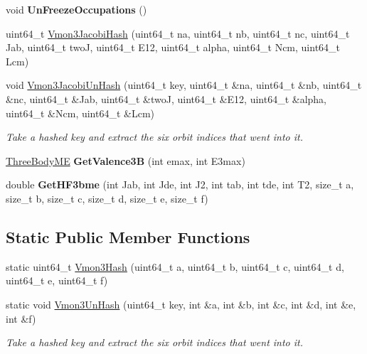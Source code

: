 \begin{DoxyCompactItemize}
\item 
\hypertarget{classHartreeFock_ab7aa734d2b1df54ddba236f279269fcc}{void {\bfseries Un\-Freeze\-Occupations} ()}\label{classHartreeFock_ab7aa734d2b1df54ddba236f279269fcc}

\item 
uint64\-\_\-t \hyperlink{classHartreeFock_ab9b00d4cece0e9424b09bd5faaef8276}{Vmon3\-Jacobi\-Hash} (uint64\-\_\-t na, uint64\-\_\-t nb, uint64\-\_\-t nc, uint64\-\_\-t Jab, uint64\-\_\-t two\-J, uint64\-\_\-t E12, uint64\-\_\-t alpha, uint64\-\_\-t Ncm, uint64\-\_\-t Lcm)
\item 
\hypertarget{classHartreeFock_a62997db6f9334dbe83c191aec4ab127d}{void \hyperlink{classHartreeFock_a62997db6f9334dbe83c191aec4ab127d}{Vmon3\-Jacobi\-Un\-Hash} (uint64\-\_\-t key, uint64\-\_\-t \&na, uint64\-\_\-t \&nb, uint64\-\_\-t \&nc, uint64\-\_\-t \&Jab, uint64\-\_\-t \&two\-J, uint64\-\_\-t \&E12, uint64\-\_\-t \&alpha, uint64\-\_\-t \&Ncm, uint64\-\_\-t \&Lcm)}\label{classHartreeFock_a62997db6f9334dbe83c191aec4ab127d}

\begin{DoxyCompactList}\small\item\em Take a hashed key and extract the six orbit indices that went into it. \end{DoxyCompactList}\item 
\hypertarget{classHartreeFock_a0793c0eb66a02f0cdb1a7b810be29c9b}{\hyperlink{classThreeBodyME}{Three\-Body\-M\-E} {\bfseries Get\-Valence3\-B} (int emax, int E3max)}\label{classHartreeFock_a0793c0eb66a02f0cdb1a7b810be29c9b}

\item 
\hypertarget{classHartreeFock_a4396c3d072ce9c31faf27dcb91fe345e}{double {\bfseries Get\-H\-F3bme} (int Jab, int Jde, int J2, int tab, int tde, int T2, size\-\_\-t a, size\-\_\-t b, size\-\_\-t c, size\-\_\-t d, size\-\_\-t e, size\-\_\-t f)}\label{classHartreeFock_a4396c3d072ce9c31faf27dcb91fe345e}

\end{DoxyCompactItemize}
\subsection*{Static Public Member Functions}
\begin{DoxyCompactItemize}
\item 
static uint64\-\_\-t \hyperlink{classHartreeFock_ab863d5d020e15854d4d591ec0ce6a1a0}{Vmon3\-Hash} (uint64\-\_\-t a, uint64\-\_\-t b, uint64\-\_\-t c, uint64\-\_\-t d, uint64\-\_\-t e, uint64\-\_\-t f)
\item 
\hypertarget{classHartreeFock_af675589807ed0369ce3c9ef30d9d625b}{static void \hyperlink{classHartreeFock_af675589807ed0369ce3c9ef30d9d625b}{Vmon3\-Un\-Hash} (uint64\-\_\-t key, int \&a, int \&b, int \&c, int \&d, int \&e, int \&f)}\label{classHartreeFock_af675589807ed0369ce3c9ef30d9d625b}

\begin{DoxyCompactList}\small\item\em Take a hashed key and extract the six orbit indices that went into it. \end{DoxyCompactList}\end{DoxyCompactItemize}
